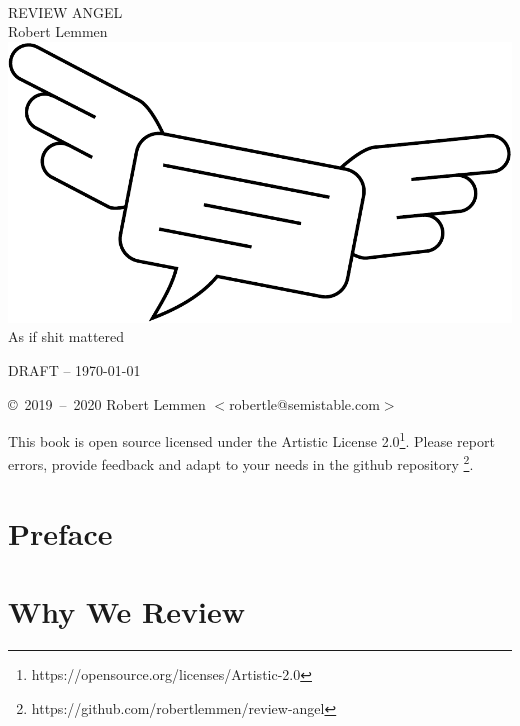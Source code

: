 \documentclass[10pt,twoside]{article}
\begin{document}
\begin{titlepage}
\begin{center}~\\
\vspace{4em}
{\fontsize{32}{32}\selectfont
REVIEW ANGEL}\\
\vspace{36pt}
{\large Robert Lemmen}
\vfill
\includegraphics[width=\textwidth]{logo}
\vfill
{\large As if shit mattered}
\vspace{3em}
\end{center}
\end{titlepage}
\thispagestyle{empty}
\clearpage

DRAFT -- \today

\vspace{1.5em}
\copyright~2019~--~2020 Robert Lemmen $<$robertle@semistable.com$>$


\vspace{1.5em}
This book is open source licensed under the Artistic License 2.0\footnote{
https://opensource.org/licenses/Artistic-2.0}. Please report errors, provide
feedback and adapt to your needs in the github repository \footnote{
https://github.com/robertlemmen/review-angel}.
\thispagestyle{empty}
\clearpage

\tableofcontents
\clearpage

\section{Preface}
\section{Why We Review}
\end{document}

